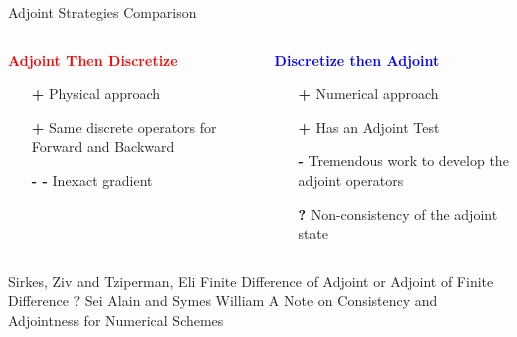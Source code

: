 \begin{frame}{Adjoint Strategies Comparison}
  \begin{columns}
    \begin{column}[t]{0.5\textwidth}
      \textbf{\textcolor{red}{Adjoint Then Discretize}}
      \vspace{0.5cm}
      \begin{itemize}
      \item[\textcolor{\mygreen}{\textbf{+}}] Physical approach
      \item[\textcolor{\mygreen}{\textbf{+}}] Same discrete operators for Forward and Backward
      \item[\textbf{- -}] Inexact gradient \cite{Sirkes}
      \end{itemize}
      \vspace{0.5cm}
    \end{column}\vrule \hfill
    \begin{column}[t]{0.5\textwidth}
      \textbf{\textcolor{blue}{Discretize then Adjoint}}
      \vspace{0.5cm}
      \begin{itemize}
      \item[\textcolor{\mygreen}{\textbf{+}}] Numerical approach
      \item[\textcolor{\mygreen}{\textbf{+}}] Has an Adjoint Test
      \item[\textbf{-}] Tremendous work to develop the adjoint operators
      \item[\textcolor{black}{\textbf{?}}] Non-consistency of the adjoint state \cite{Set1997Feb}
      \end{itemize}
    \end{column}
  \end{columns}

  \vfill
  \tiny
  \begin{thebibliography}{2}
     Sirkes, Ziv and Tziperman, Eli
      \newblock Finite Difference of Adjoint or Adjoint of Finite Difference ?
   Sei Alain and Symes William
    \newblock A Note on Consistency and Adjointness for Numerical Schemes
  \end{thebibliography}

\end{frame}
